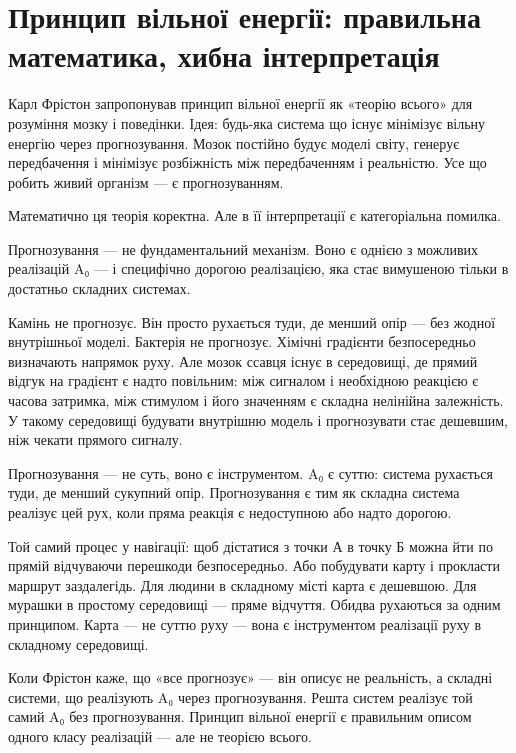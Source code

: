 \documentclass[12pt, a4paper, openany]{book}
\begin{document}
\section{Принцип вільної енергії: правильна математика, хибна інтерпретація}

Карл Фрістон запропонував принцип вільної енергії як «теорію всього» для розуміння мозку і поведінки. Ідея: будь-яка система що існує мінімізує вільну енергію через прогнозування. Мозок постійно будує моделі світу, генерує передбачення і мінімізує розбіжність між передбаченням і реальністю. Усе що робить живий організм — є прогнозуванням.

Математично ця теорія коректна. Але в її інтерпретації є категоріальна помилка.

Прогнозування — не фундаментальний механізм. Воно є однією з можливих реалізацій A₀ — і специфічно дорогою реалізацією, яка стає вимушеною тільки в достатньо складних системах.

Камінь не прогнозує. Він просто рухається туди, де менший опір — без жодної внутрішньої моделі. Бактерія не прогнозує. Хімічні градієнти безпосередньо визначають напрямок руху. Але мозок ссавця існує в середовищі, де прямий відгук на градієнт є надто повільним: між сигналом і необхідною реакцією є часова затримка, між стимулом і його значенням є складна нелінійна залежність. У такому середовищі будувати внутрішню модель і прогнозувати стає дешевшим, ніж чекати прямого сигналу.

Прогнозування — не суть, воно є інструментом. A₀ є суттю: система рухається туди, де менший сукупний опір. Прогнозування є тим як складна система реалізує цей рух, коли пряма реакція є недоступною або надто дорогою.

\begin{analogybox}
Той самий процес у навігації: щоб дістатися з точки А в точку Б можна йти по прямій відчуваючи перешкоди безпосередньо. Або побудувати карту і прокласти маршрут заздалегідь. Для людини в складному місті карта є дешевшою. Для мурашки в простому середовищі --- пряме відчуття. Обидва рухаються за одним принципом. Карта — не суттю руху --- вона є інструментом реалізації руху в складному середовищі.
\end{analogybox}

Коли Фрістон каже, що «все прогнозує» --- він описує не реальність, а складні системи, що реалізують A₀ через прогнозування. Решта систем реалізує той самий A₀ без прогнозування. Принцип вільної енергії є правильним описом одного класу реалізацій --- але не теорією всього.
\end{document}
